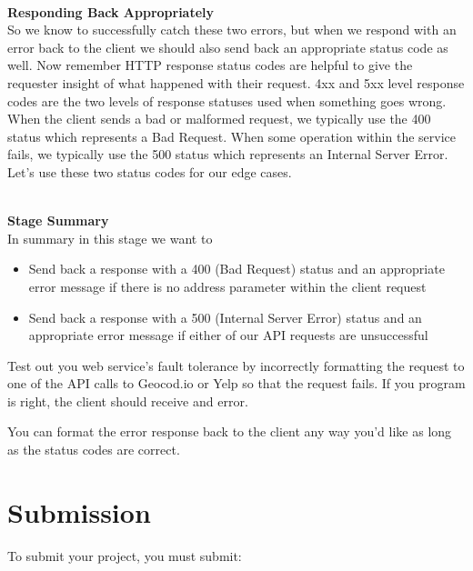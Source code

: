 \documentclass{article}
\begin{document}
\-\ \\
\textbf{Responding Back Appropriately}\\
So we know to successfully catch these two errors, but when we respond with an error back to the client we should also send back an appropriate status code as well. Now remember HTTP response status codes are helpful to give the requester insight of what happened with their request. 4xx and 5xx level response codes are the two levels of response statuses used when something goes wrong. When the client sends a bad or malformed request, we typically use the 400 status which represents a Bad Request. When some operation within the service fails, we typically use the 500 status which represents an Internal Server Error. Let's use these two status codes for our edge cases.

\-\ \\
\textbf{Stage Summary}\\
In summary in this stage we want to
\begin{itemize}
\item Send back a response with a 400 (Bad Request) status and an appropriate error message if there is no address parameter within the client request
\item Send back a response with a  500 (Internal Server Error) status and an appropriate error message if either of our API requests are unsuccessful
\end{itemize}

\begin{info}
Test out you web service's fault tolerance by incorrectly formatting the request to one of the API calls to Geocod.io or Yelp so that the request fails. If you program is right, the client should receive and error. 
\end{info}

\begin{info}
You can format the error response back to the client any way you'd like as long as the status codes are correct. 
\end{info}






\section*{Submission } 
To submit your project, you must submit:
\end{document}
